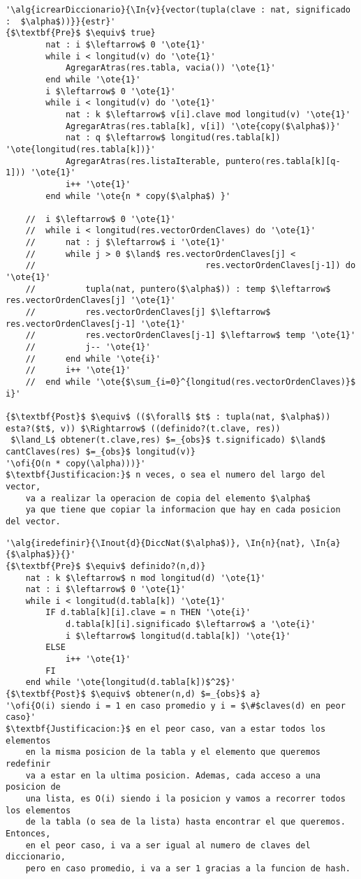 \begin{lstlisting}[mathescape]
'\alg{icrearDiccionario}{\In{v}{vector(tupla(clave : nat, significado :  $\alpha$))}}{estr}'
{$\textbf{Pre}$ $\equiv$ true}
		nat : i $\leftarrow$ 0 '\ote{1}'
		while i < longitud(v) do '\ote{1}'
			AgregarAtras(res.tabla, vacia()) '\ote{1}'
		end while '\ote{1}'
		i $\leftarrow$ 0 '\ote{1}'
		while i < longitud(v) do '\ote{1}'
			nat : k $\leftarrow$ v[i].clave mod longitud(v) '\ote{1}'
			AgregarAtras(res.tabla[k], v[i]) '\ote{copy($\alpha$)}'
			nat : q $\leftarrow$ longitud(res.tabla[k]) '\ote{longitud(res.tabla[k])}'
			AgregarAtras(res.listaIterable, puntero(res.tabla[k][q-1])) '\ote{1}'
			i++ '\ote{1}'
		end while '\ote{n * copy($\alpha$) }'

	//	i $\leftarrow$ 0 '\ote{1}'
	//	while i < longitud(res.vectorOrdenClaves) do '\ote{1}'
	//		nat : j $\leftarrow$ i '\ote{1}'
	//		while j > 0 $\land$ res.vectorOrdenClaves[j] <
	//									res.vectorOrdenClaves[j-1]) do '\ote{1}'
	//			tupla(nat, puntero($\alpha$)) : temp $\leftarrow$ res.vectorOrdenClaves[j] '\ote{1}'
	//			res.vectorOrdenClaves[j] $\leftarrow$ res.vectorOrdenClaves[j-1] '\ote{1}'
	//			res.vectorOrdenClaves[j-1] $\leftarrow$ temp '\ote{1}'
	//			j-- '\ote{1}'
	//		end while '\ote{i}'
	//		i++ '\ote{1}'
	//	end while '\ote{$\sum_{i=0}^{longitud(res.vectorOrdenClaves)}$ i}'

{$\textbf{Post}$ $\equiv$ (($\forall$ $t$ : tupla(nat, $\alpha$)) esta?($t$, v)) $\Rightarrow$ ((definido?(t.clave, res))
 $\land_L$ obtener(t.clave,res) $=_{obs}$ t.significado) $\land$ cantClaves(res) $=_{obs}$ longitud(v)}
'\ofi{O(n * copy(\alpha)))}'
$\textbf{Justificacion:}$ n veces, o sea el numero del largo del vector,
	va a realizar la operacion de copia del elemento $\alpha$
	ya que tiene que copiar la informacion que hay en cada posicion del vector.
\end{lstlisting}

\begin{lstlisting}[mathescape]
'\alg{iredefinir}{\Inout{d}{DiccNat($\alpha$)}, \In{n}{nat}, \In{a}{$\alpha$}}{}'
{$\textbf{Pre}$ $\equiv$ definido?(n,d)}
	nat : k $\leftarrow$ n mod longitud(d) '\ote{1}'
	nat : i $\leftarrow$ 0 '\ote{1}'
	while i < longitud(d.tabla[k]) '\ote{1}'
		IF d.tabla[k][i].clave = n THEN '\ote{i}'
			d.tabla[k][i].significado $\leftarrow$ a '\ote{i}'
			i $\leftarrow$ longitud(d.tabla[k]) '\ote{1}'
		ELSE
			i++ '\ote{1}'
		FI
	end while '\ote{longitud(d.tabla[k])$^2$}'
{$\textbf{Post}$ $\equiv$ obtener(n,d) $=_{obs}$ a}
'\ofi{O(i) siendo i = 1 en caso promedio y i = $\#$claves(d) en peor caso}'
$\textbf{Justificacion:}$ en el peor caso, van a estar todos los elementos
	en la misma posicion de la tabla y el elemento que queremos redefinir
	va a estar en la ultima posicion. Ademas, cada acceso a una posicion de
	una lista, es O(i) siendo i la posicion y vamos a recorrer todos los elementos
	de la tabla (o sea de la lista) hasta encontrar el que queremos. Entonces,
	en el peor caso, i va a ser igual al numero de claves del diccionario,
	pero en caso promedio, i va a ser 1 gracias a la funcion de hash.
\end{lstlisting}

